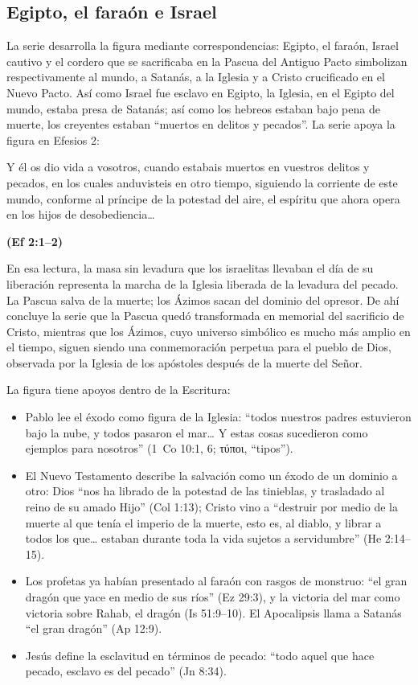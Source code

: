 \documentclass[11pt,letterpaper]{article}
\newcommand{\grc}[1]{\foreignlanguage{ancientgreek}{#1}}
\newcommand{\fuente}[1]{\par\hfill{\upshape\bfseries\small\textcolor{tierraroja}{#1}}}
\begin{document}
\subsection{Egipto, el faraón e Israel}
La serie desarrolla la figura mediante correspondencias: Egipto, el faraón, Israel cautivo y el cordero que se sacrificaba en la Pascua del Antiguo Pacto simbolizan respectivamente al mundo, a Satanás, a la Iglesia y a Cristo crucificado en el Nuevo Pacto. Así como Israel fue esclavo en Egipto, la Iglesia, en el Egipto del mundo, estaba presa de Satanás; así como los hebreos estaban bajo pena de muerte, los creyentes estaban ``muertos en delitos y pecados''. La serie apoya la figura en Efesios 2:

\begin{cita}Y él os dio vida a vosotros, cuando estabais muertos en vuestros delitos y pecados, en los cuales anduvisteis en otro tiempo, siguiendo la corriente de este mundo, conforme al príncipe de la potestad del aire, el espíritu que ahora opera en los hijos de desobediencia\ldots\fuente{(Ef 2:1--2)}\end{cita}

En esa lectura, la masa sin levadura que los israelitas llevaban el día de su liberación representa la marcha de la Iglesia liberada de la levadura del pecado. La Pascua salva de la muerte; los Ázimos sacan del dominio del opresor. De ahí concluye la serie que la Pascua quedó transformada en memorial del sacrificio de Cristo, mientras que los Ázimos, cuyo universo simbólico es mucho más amplio en el tiempo, siguen siendo una conmemoración perpetua para el pueblo de Dios, observada por la Iglesia de los apóstoles después de la muerte del Señor.

La figura tiene apoyos dentro de la Escritura:
\begin{itemize}\setlength{\itemsep}{1pt}
\item Pablo lee el éxodo como figura de la Iglesia: ``todos nuestros padres estuvieron bajo la nube, y todos pasaron el mar\ldots{} Y estas cosas sucedieron como ejemplos para nosotros'' (1~Co 10:1, 6; \grc{τύποι}, ``tipos'').
\item El Nuevo Testamento describe la salvación como un éxodo de un dominio a otro: Dios ``nos ha librado de la potestad de las tinieblas, y trasladado al reino de su amado Hijo'' (Col 1:13); Cristo vino a ``destruir por medio de la muerte al que tenía el imperio de la muerte, esto es, al diablo, y librar a todos los que\ldots{} estaban durante toda la vida sujetos a servidumbre'' (He 2:14--15).
\item Los profetas ya habían presentado al faraón con rasgos de monstruo: ``el gran dragón que yace en medio de sus ríos'' (Ez 29:3), y la victoria del mar como victoria sobre Rahab, el dragón (Is 51:9--10). El Apocalipsis llama a Satanás ``el gran dragón'' (Ap 12:9).
\item Jesús define la esclavitud en términos de pecado: ``todo aquel que hace pecado, esclavo es del pecado'' (Jn 8:34).
\end{itemize}
\end{document}
